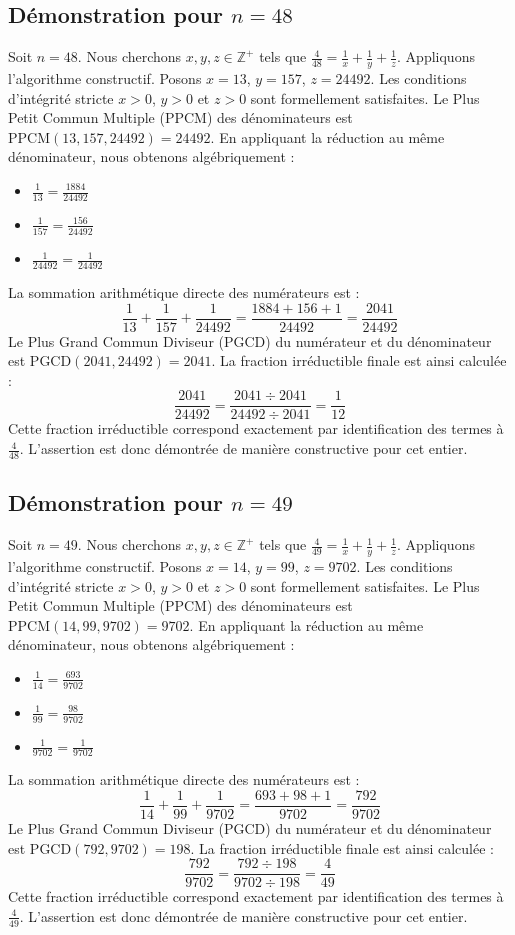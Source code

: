 \documentclass[11pt,a4paper]{article}
\begin{document}
\subsection{Démonstration pour $n = 48$}
Soit $n = 48$. Nous cherchons $x, y, z \in \mathbb{Z}^{+}$ tels que $\frac{4}{48} = \frac{1}{x} + \frac{1}{y} + \frac{1}{z}$.
Appliquons l'algorithme constructif. Posons $x = 13$, $y = 157$, $z = 24492$.
Les conditions d'intégrité stricte $x > 0$, $y > 0$ et $z > 0$ sont formellement satisfaites.
Le Plus Petit Commun Multiple (PPCM) des dénominateurs est $\text{PPCM}(13, 157, 24492) = 24492$.
En appliquant la réduction au même dénominateur, nous obtenons algébriquement :
\begin{itemize}
    \item $\frac{1}{13} = \frac{1884}{24492}$
    \item $\frac{1}{157} = \frac{156}{24492}$
    \item $\frac{1}{24492} = \frac{1}{24492}$
\end{itemize}
La sommation arithmétique directe des numérateurs est :
$$ \frac{1}{13} + \frac{1}{157} + \frac{1}{24492} = \frac{1884 + 156 + 1}{24492} = \frac{2041}{24492} $$
Le Plus Grand Commun Diviseur (PGCD) du numérateur et du dénominateur est $\text{PGCD}(2041, 24492) = 2041$.
La fraction irréductible finale est ainsi calculée :
$$ \frac{2041}{24492} = \frac{2041 \div 2041}{24492 \div 2041} = \frac{1}{12} $$
Cette fraction irréductible correspond exactement par identification des termes à $\frac{4}{48}$. L'assertion est donc démontrée de manière constructive pour cet entier.

\subsection{Démonstration pour $n = 49$}
Soit $n = 49$. Nous cherchons $x, y, z \in \mathbb{Z}^{+}$ tels que $\frac{4}{49} = \frac{1}{x} + \frac{1}{y} + \frac{1}{z}$.
Appliquons l'algorithme constructif. Posons $x = 14$, $y = 99$, $z = 9702$.
Les conditions d'intégrité stricte $x > 0$, $y > 0$ et $z > 0$ sont formellement satisfaites.
Le Plus Petit Commun Multiple (PPCM) des dénominateurs est $\text{PPCM}(14, 99, 9702) = 9702$.
En appliquant la réduction au même dénominateur, nous obtenons algébriquement :
\begin{itemize}
    \item $\frac{1}{14} = \frac{693}{9702}$
    \item $\frac{1}{99} = \frac{98}{9702}$
    \item $\frac{1}{9702} = \frac{1}{9702}$
\end{itemize}
La sommation arithmétique directe des numérateurs est :
$$ \frac{1}{14} + \frac{1}{99} + \frac{1}{9702} = \frac{693 + 98 + 1}{9702} = \frac{792}{9702} $$
Le Plus Grand Commun Diviseur (PGCD) du numérateur et du dénominateur est $\text{PGCD}(792, 9702) = 198$.
La fraction irréductible finale est ainsi calculée :
$$ \frac{792}{9702} = \frac{792 \div 198}{9702 \div 198} = \frac{4}{49} $$
Cette fraction irréductible correspond exactement par identification des termes à $\frac{4}{49}$. L'assertion est donc démontrée de manière constructive pour cet entier.
\end{document}
